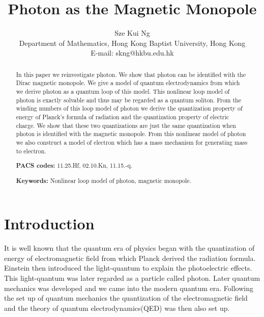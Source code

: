 \documentclass[a4paper,a4paper]{article}
\title{Photon as the Magnetic Monopole}
\author{Sze Kui Ng
\\  Department of Mathematics,
Hong Kong Baptist University, Hong Kong
\\E-mail: skng@hkbu.edu.hk
}
\begin{document}
\date{}
\maketitle
\begin{abstract}

In this paper we reinvestigate photon. We show that photon can be identified with the Dirac magnetic monopole. We give a model of quantum electrodynamics from which we derive photon as a quantum loop of this model. This nonlinear loop model of photon is exactly solvable and thus  may be regarded as a quantum soliton. From the winding numbers of this loop model of photon we derive the quantization property of energy of Planck's formula of radiation and the quantization property of electric charge. We show that these two quantizations are just the same quantization when photon is identified with the magnetic monopole. From this nonlinear model of photon we also construct a model of electron which has a mass mechanism for generating mass to electron.

{\bf PACS codes: } 11.25.Hf, 02.10.Kn,  11.15.-q.

{\bf Keywords:} Nonlinear loop model of photon, magnetic monopole.

\end{abstract}

\section{Introduction}\label{sec00}

                                        

It is well known that the quantum era of physics began with the quantization of energy of electromagnetic field from which Planck derived the radiation formula. Einstein then introduced the light-quantum to explain the photoelectric effects. This light-quantum was later regarded as a particle called  photon\cite{Pai}\cite{Pla}\cite{Ein}. Later quantum mechanics was developed and we came into the modern quantum era. Following the set up of quantum mechanics the quantization of the electromagnetic field and the theory of quantum electrodynamics(QED) was then also set up.
\end{document}
